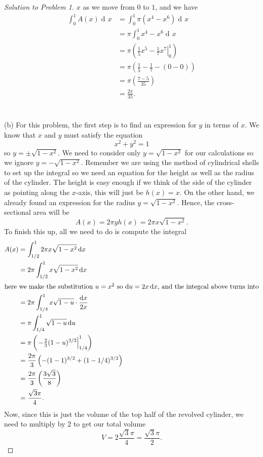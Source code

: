 \documentclass[12pt]{article}
\theoremstyle{plain}
\theoremstyle{definition}
\theoremstyle{remark}
\DeclareMathOperator{\diff}{d\!}
\begin{document}
\begin{proof}[Solution to Problem 1]
$x$ as we move from $0$ to $1$, and we have
\begin{align*}
\int_0^1 A(x)\diff x
&=\int_0^1 \pi\left(x^4-x^6\right)\diff x\\
&=\pi\int_0^1 x^4-x^6\diff x\\
&=\pi\left(\left.\tfrac{1}{5}x^5-\tfrac{1}{7}x^7\right|_0^1\right)\\
&=\pi\left(\frac{1}{5}-\frac{1}{7}-(0-0)\right)\\
&=\pi\left(\frac{7-5}{35}\right)\\
&=\boxed{\frac{2\pi}{35}.}
\end{align*}
\\\\
(b) For this problem, the first step is to find an expression for $y$ in
terms of $x$. We know that $x$ and $y$ must satisfy the equation
\[
x^2+y^2=1
\]
so $y=\pm\sqrt{1-x^2}$. We need to consider only $y=\sqrt{1-x^2}$ for our
calculations so we ignore $y=-\sqrt{1-x^2}$. Remember we are using the
method of cylindrical shells to set up the integral so we need an equation
for the height as well as the radius of the cylinder. The height is easy
enough if we think of the side of the cylinder as pointing along the
$x$-axis, this will just be $h(x)=x$. On the other hand, we already found
an expression for the radius $y=\sqrt{1-x^2}$. Hence, the cross-sectional
area will be
\[
A(x)=2\pi y h(x)=2\pi x\sqrt{1-x^2}.
\]
To finish this up, all we need
to do is compute the integral
\begin{align*}
A(x)&=\int_{1/2}^1 2\pi x\sqrt{1-x^2}\diff x\\
    &=2\pi\int_{1/2}^1 x\sqrt{1-x^2}\diff x\\
\shortintertext{here we make the substitution $u=x^2$ so $\diff u=2x\diff
  x$, and the integcal above turns into}
&=2\pi\int_{1/4}^1 x\sqrt{1-u}\cdot \frac{\diff x}{2x}\\
&=\pi\int_{1/4}^1 \sqrt{1-u}\diff u\\
&=\pi\left(\left.-\tfrac{2}{3}(1-u)^{3/2}\right|_{1/4}^1 \right)\\
&=\frac{2\pi}{3}\left(-(1-1)^{3/2}+(1-1/4)^{3/2}\right)\\
&=\frac{2\pi}{3}\left(\frac{3\sqrt{3}}{8}\right)\\
&=\frac{\sqrt{3}\pi}{4}.
\end{align*}
Now, since this is just the volume of the top half of the revolved
cylinder, we need to multiply by $2$ to get our total volume
\[
\boxed{V=2\frac{\sqrt{3}\pi}{4}=\frac{\sqrt{3}\pi}{2}.}
\]


\end{proof}
\end{document}
